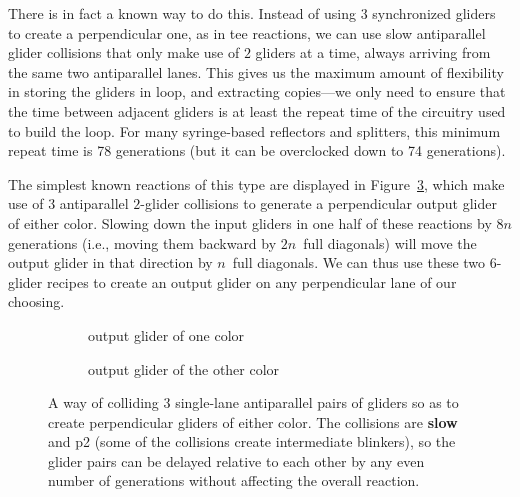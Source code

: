 There is in fact a known way to do this. Instead of using $3$ synchronized gliders to create a perpendicular one, as in tee reactions, we can use slow antiparallel glider collisions that only make use of $2$ gliders at a time, always arriving from the same two antiparallel lanes. This gives us the maximum amount of flexibility in storing the gliders in loop, and extracting copies---we only need to ensure that the time between adjacent gliders is at least the repeat time of the circuitry used to build the loop. For many syringe-based reflectors and splitters, this minimum repeat time is 78 generations (but it can be overclocked down to 74 generations).

The simplest known reactions of this type are displayed in Figure~\ref{fig:armless_tee}, which make use of $3$ antiparallel $2$-glider collisions to generate a perpendicular output glider of either color. Slowing down the input gliders in one half of these reactions by $8n$ generations (i.e., moving them backward by $2n$~full diagonals) will move the output glider in that direction by $n$~full diagonals. We can thus use these two $6$-glider recipes to create an output glider on any perpendicular lane of our choosing.

\begin{figure}[!htb]
	\centering
	\begin{subfigure}{0.485\textwidth}
		\centering
		\caption{output glider of one color}
		\label{fig:armless_tee_0}
	\end{subfigure} \hfill \begin{subfigure}{.485\textwidth}
		\centering
		\caption{output glider of the other color}
		\label{fig:armless_tee_1}
	\end{subfigure}
	\caption{A way of colliding $3$ single-lane antiparallel pairs of gliders so as to create perpendicular gliders of either color. The collisions are \textbf{slow} and p2 (some of the collisions create intermediate blinkers), so the glider pairs can be delayed relative to each other by any even number of generations without affecting the overall reaction.}\label{fig:armless_tee}
\end{figure}

